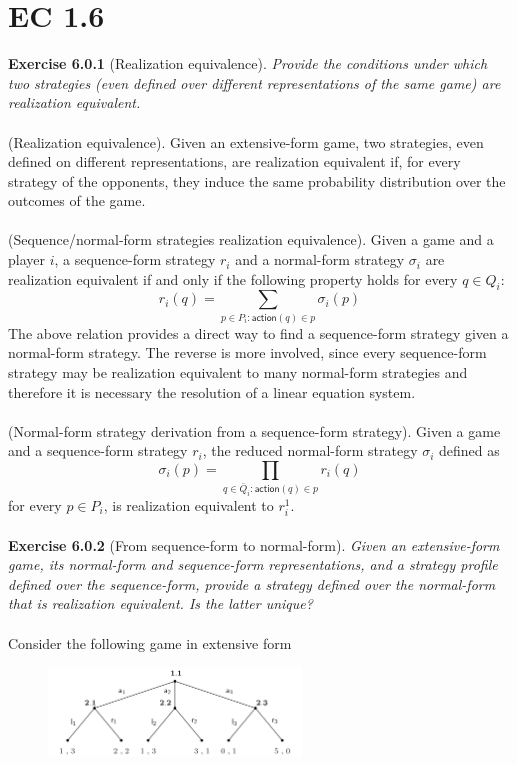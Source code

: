 \section{EC 1.6}
\textbf{Exercise 6.0.1} (Realization equivalence). \textit{Provide the conditions under which two strategies (even defined over
different representations of the same game) are realization equivalent.}\\\\
(Realization equivalence). Given an extensive-form game, two strategies, even defined on different
representations, are realization equivalent if, for every strategy of the opponents, they induce the same probability
distribution over the outcomes of the game.\\\\
(Sequence/normal-form strategies realization equivalence). Given a game and a player $i$, a sequence-form strategy $r_i$ and a normal-form strategy $\sigma_i$ are realization equivalent if and only if the following property holds for every $q \in Q_i$:
$$ r_{i}(q) = \sum_{p \in P_i:\mathsf{action}(q) \in p} \sigma_{i}(p) $$
The above relation provides a direct way to find a sequence-form strategy given a normal-form strategy. The reverse is more involved, since every sequence-form strategy may be realization equivalent to many normal-form strategies and therefore it is necessary the resolution of a linear equation system.\\\\
(Normal-form strategy derivation from a sequence-form strategy). Given a game and a sequence-form strategy $r_{i}$, the reduced normal-form strategy $\sigma_{i}$ defined as
$$
\sigma_{i}(p)=\prod_{q \in \bar{Q}_{i}: \textsf{action}(q) \in p} r_{i}(q)
$$
for every $p \in P_{i}$, is realization equivalent to $r_{i}^{1}$.\\\\
\textbf{Exercise 6.0.2} (From sequence-form to normal-form). \textit{Given an extensive-form game, its normal-form and sequence-form representations, and a strategy profile defined over the sequence-form, provide a strategy defined over the normal-form that is realization equivalent. Is the latter unique?}\\\\
Consider the following game in extensive form
\begin{figure}[H]
\centering
\includegraphics[width=0.6\textwidth]{images/img_1_6_01.png}
\end{figure}
